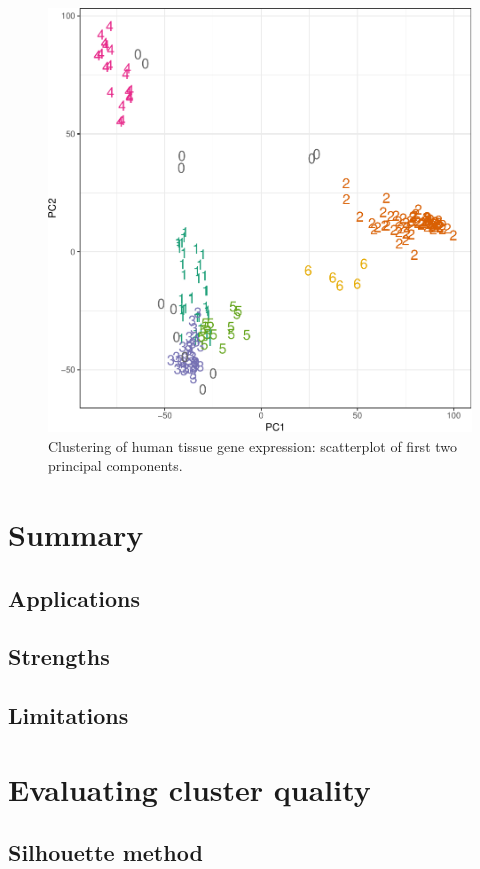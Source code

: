 \documentclass[]{book}
\theoremstyle{definition}
\theoremstyle{definition}
\theoremstyle{definition}
\theoremstyle{remark}
\begin{document}
\begin{figure}

{\centering \includegraphics[width=0.6\linewidth]{09-clustering_files/figure-latex/tissueExpressionDBSCANscatter-1} 

}

\caption{Clustering of human tissue gene expression: scatterplot of first two principal components.}\label{fig:tissueExpressionDBSCANscatter}
\end{figure}

\section{Summary}\label{summary}

\subsection{Applications}\label{applications}

\subsection{Strengths}\label{strengths}

\subsection{Limitations}\label{limitations}

\section{Evaluating cluster quality}\label{evaluating-cluster-quality}

\subsection{Silhouette method}\label{silhouette-method}
\end{document}
